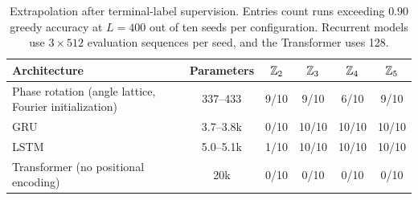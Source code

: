 \begin{table}[H]
\centering\small
\caption{Extrapolation after terminal-label supervision. Entries count
runs exceeding $0.90$ greedy accuracy at $L=400$ out of ten seeds per
configuration. Recurrent models use $3\times512$ evaluation sequences per
seed, and the Transformer uses 128.}
\label{tab:lengthgen-arch}
\begin{tabular}{lccccc}
\toprule
Architecture & Parameters & $\mathbb{Z}_2$ & $\mathbb{Z}_3$ & $\mathbb{Z}_4$ & $\mathbb{Z}_5$ \\
\midrule
Phase rotation (angle lattice, Fourier initialization) & 337--433 & 9/10 & 9/10 & 6/10 & 9/10 \\
GRU & 3.7--3.8k & 0/10 & 10/10 & 10/10 & 10/10 \\
LSTM & 5.0--5.1k & 1/10 & 10/10 & 10/10 & 10/10 \\
Transformer (no positional encoding) & 20k & 0/10 & 0/10 & 0/10 & 0/10 \\
\bottomrule
\end{tabular}
\end{table}
